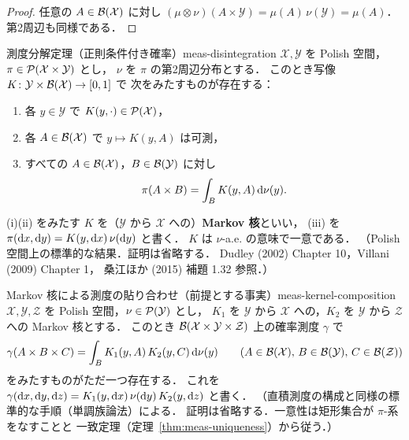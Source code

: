 \begin{proof}
  任意の $A\in\mathcal{B}(\mathcal{X})$ に対し
  $(\mu\otimes\nu)(A\times \mathcal{Y})=\mu(A)\,\nu(\mathcal{Y})=\mu(A)$．
  第2周辺も同様である．
\end{proof}

\begin{theorem}{測度分解定理（正則条件付き確率）}{meas-disintegration}
  $\mathcal{X},\mathcal{Y}$ を Polish 空間，$\pi\in\mathcal{P}(\mathcal{X}\times \mathcal{Y})$ とし，
  $\nu$ を $\pi$ の第2周辺分布とする．
  このとき写像 $K\colon \mathcal{Y}\times\mathcal{B}(\mathcal{X})\to[0,1]$ で
  次をみたすものが存在する：
  \begin{enumerate}
    \item 各 $y\in \mathcal{Y}$ で $K(y,\cdot)\in\mathcal{P}(\mathcal{X})$，
    \item 各 $A\in\mathcal{B}(\mathcal{X})$ で $y\mapsto K(y,A)$ は可測，
    \item すべての $A\in\mathcal{B}(\mathcal{X})$，$B\in\mathcal{B}(\mathcal{Y})$ に対し
      \[
        \pi(A\times B)=\int_B K(y,A)\,\mathrm{d}\nu(y).
      \]
  \end{enumerate}
  (i)(ii) をみたす $K$ を（$\mathcal{Y}$ から $\mathcal{X}$ への）\textbf{Markov 核}といい，
  (iii) を $\pi(\mathrm{d} x,\mathrm{d} y)=K(y,\mathrm{d} x)\,\nu(\mathrm{d} y)$ と書く．
  $K$ は $\nu$-a.e. の意味で一意である．
  （Polish 空間上の標準的な結果．証明は省略する．
  Dudley (2002) Chapter 10，Villani (2009) Chapter 1，
  桑江ほか (2015) 補題 1.32 参照．）
\end{theorem}

\begin{theorem}{Markov 核による測度の貼り合わせ（前提とする事実）}{meas-kernel-composition}
  $\mathcal{X},\mathcal{Y},\mathcal{Z}$ を Polish 空間，$\nu\in\mathcal{P}(\mathcal{Y})$ とし，
  $K_1$ を $\mathcal{Y}$ から $\mathcal{X}$ への，$K_2$ を $\mathcal{Y}$ から $\mathcal{Z}$ への Markov 核とする．
  このとき $\mathcal{B}(\mathcal{X}\times \mathcal{Y}\times \mathcal{Z})$ 上の確率測度 $\gamma$ で
  \[
    \gamma(A\times B\times C)
    =\int_B K_1(y,A)\,K_2(y,C)\,\mathrm{d}\nu(y)
    \qquad(A\in\mathcal{B}(\mathcal{X}),\,B\in\mathcal{B}(\mathcal{Y}),\,C\in\mathcal{B}(\mathcal{Z}))
  \]
  をみたすものがただ一つ存在する．
  これを $\gamma(\mathrm{d} x,\mathrm{d} y,\mathrm{d} z)=K_1(y,\mathrm{d} x)\,\nu(\mathrm{d} y)\,K_2(y,\mathrm{d} z)$ と書く．
  （直積測度の構成と同様の標準的な手順（単調族論法）による．
  証明は省略する．一意性は矩形集合が $\pi$-系をなすことと
  一致定理（定理~\ref{thm:meas-uniqueness}）から従う．）
\end{theorem}

